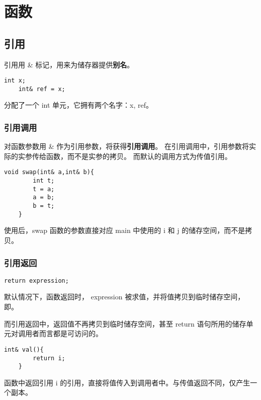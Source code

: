 \chapter{函数}
\newpage

\section{引用}

引用用 \& 标记，用来为储存器提供\textbf{别名}。

\begin{lstlisting}[frame=shadowbox]
    int x;
    int& ref = x;
\end{lstlisting}

分配了一个 int 单元，它拥有两个名字：x, ref。

\subsection{引用调用}

对函数参数用 \& 作为引用参数，将获得\textbf{引用调用}。
在引用调用中，引用参数将实际的实参传给函数，而不是实参的拷贝。
而默认的调用方式为传值引用。

\begin{lstlisting}[frame=shadowbox]
    void swap(int& a,int& b){
        int t;
        t = a;
        a = b;
        b = t;
    }
\end{lstlisting}

使用后，swap 函数的参数直接对应 main 中使用的 i 和 j 的储存空间，而不是拷贝。

\newpage

\subsection{引用返回}

\begin{lstlisting}[frame=shadowbox]
    return expression;    
\end{lstlisting}

默认情况下，函数返回时， expression 被求值，并将值拷贝到临时储存空间，即。

而引用返回中，返回值不再拷贝到临时储存空间，甚至 return 语句所用的储存单元对调用者而言都是可访问的。

\begin{lstlisting}[frame=shadowbox]
    int& val(){
        return i;
    }    
\end{lstlisting}

函数中返回引用 i 的引用，直接将值传入到调用者中。与传值返回不同，仅产生一个副本。

